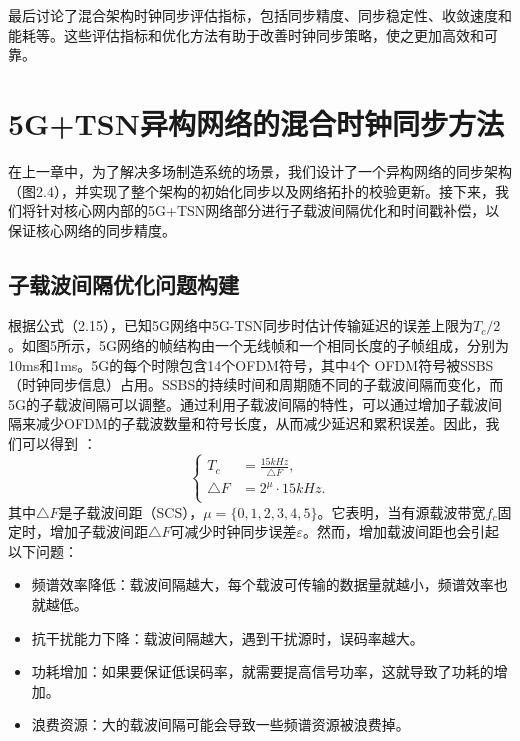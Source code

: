 \documentclass[UTF8,a4paper,12pt]{ctexart}
\numberwithin{equation}{section}
\begin{document}
最后讨论了混合架构时钟同步评估指标，包括同步精度、同步稳定性、收敛速度和能耗等。这些评估指标和优化方法有助于改善时钟同步策略，使之更加高效和可靠。

\newpage
{}
\section{5G+TSN异构网络的混合时钟同步方法}
在上一章中，为了解决多场制造系统的场景，我们设计了一个异构网络的同步架构（图2.4），并实现了整个架构的初始化同步以及网络拓扑的校验更新。接下来，我们将针对核心网内部的5G+TSN网络部分进行子载波间隔优化和时间戳补偿，以保证核心网络的同步精度。

\subsection{子载波间隔优化问题构建}
根据公式（2.15），已知5G网络中5G-TSN同步时估计传输延迟的误差上限为$T_c/2$。如图5所示，5G网络的帧结构由一个无线帧和一个相同长度的子帧组成，分别为10ms和1ms。5G的每个时隙包含14个OFDM符号，其中4个 OFDM符号被SSBS（时钟同步信息）占用。SSBS的持续时间和周期随不同的子载波间隔而变化，而5G的子载波间隔可以调整。通过利用子载波间隔的特性，可以通过增加子载波间隔来减少OFDM的子载波数量和符号长度，从而减少延迟和累积误差。因此，我们可以得到 ：
\begin{equation}
	\left\{
	\begin{aligned}
		T_{c}&=\frac{15kHz}{\triangle F},\\
		\triangle F&=2^\mu\cdot15kHz.\\
	\end{aligned}
	\right.
\end{equation}
其中$\triangle F$是子载波间距（SCS），$\mu=\{0,1,2,3,4,5\}$。它表明，当有源载波带宽$f_c$固定时，增加子载波间距$\triangle F$可减少时钟同步误差$\varepsilon$。然而，增加载波间距也会引起以下问题：
\begin{itemize}
	\item 频谱效率降低：载波间隔越大，每个载波可传输的数据量就越小，频谱效率也就越低。
	
	\item 抗干扰能力下降：载波间隔越大，遇到干扰源时，误码率越大。
	
	\item 功耗增加：如果要保证低误码率，就需要提高信号功率，这就导致了功耗的增加。
	
	\item 浪费资源：大的载波间隔可能会导致一些频谱资源被浪费掉。
\end{itemize}
\end{document}
